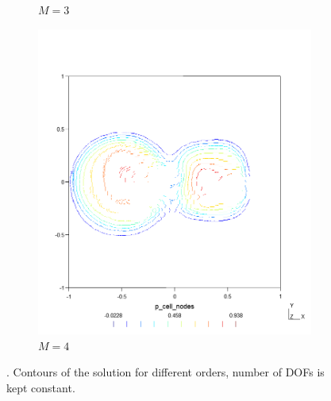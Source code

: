 \begin{figure}[p!]
\begin{subfigure}{.5\textwidth}
        \caption{$M = 3$}
    \end{subfigure}%
    \begin{subfigure}{.5\textwidth}
        \centering
        \includegraphics[width=\linewidth]{../figs/sols/kriv-sol-h2304o04}
        \caption{$M=4$}
    \end{subfigure}
    \caption{. Contours of the solution for different orders, number
    of DOFs is kept constant.}
    \label{fig:sol_cont_adv2D}
\end{figure}
